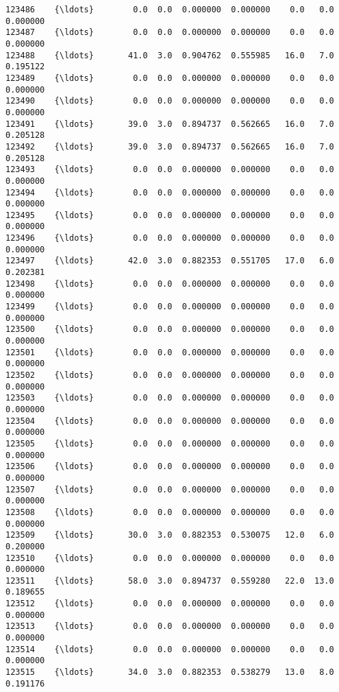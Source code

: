 \documentclass[11pt]{article}
\begin{document}
\begin{Verbatim}[commandchars=\\\{\}]
123486    {\ldots}        0.0  0.0  0.000000  0.000000    0.0   0.0  0.000000   
123487    {\ldots}        0.0  0.0  0.000000  0.000000    0.0   0.0  0.000000   
123488    {\ldots}       41.0  3.0  0.904762  0.555985   16.0   7.0  0.195122   
123489    {\ldots}        0.0  0.0  0.000000  0.000000    0.0   0.0  0.000000   
123490    {\ldots}        0.0  0.0  0.000000  0.000000    0.0   0.0  0.000000   
123491    {\ldots}       39.0  3.0  0.894737  0.562665   16.0   7.0  0.205128   
123492    {\ldots}       39.0  3.0  0.894737  0.562665   16.0   7.0  0.205128   
123493    {\ldots}        0.0  0.0  0.000000  0.000000    0.0   0.0  0.000000   
123494    {\ldots}        0.0  0.0  0.000000  0.000000    0.0   0.0  0.000000   
123495    {\ldots}        0.0  0.0  0.000000  0.000000    0.0   0.0  0.000000   
123496    {\ldots}        0.0  0.0  0.000000  0.000000    0.0   0.0  0.000000   
123497    {\ldots}       42.0  3.0  0.882353  0.551705   17.0   6.0  0.202381   
123498    {\ldots}        0.0  0.0  0.000000  0.000000    0.0   0.0  0.000000   
123499    {\ldots}        0.0  0.0  0.000000  0.000000    0.0   0.0  0.000000   
123500    {\ldots}        0.0  0.0  0.000000  0.000000    0.0   0.0  0.000000   
123501    {\ldots}        0.0  0.0  0.000000  0.000000    0.0   0.0  0.000000   
123502    {\ldots}        0.0  0.0  0.000000  0.000000    0.0   0.0  0.000000   
123503    {\ldots}        0.0  0.0  0.000000  0.000000    0.0   0.0  0.000000   
123504    {\ldots}        0.0  0.0  0.000000  0.000000    0.0   0.0  0.000000   
123505    {\ldots}        0.0  0.0  0.000000  0.000000    0.0   0.0  0.000000   
123506    {\ldots}        0.0  0.0  0.000000  0.000000    0.0   0.0  0.000000   
123507    {\ldots}        0.0  0.0  0.000000  0.000000    0.0   0.0  0.000000   
123508    {\ldots}        0.0  0.0  0.000000  0.000000    0.0   0.0  0.000000   
123509    {\ldots}       30.0  3.0  0.882353  0.530075   12.0   6.0  0.200000   
123510    {\ldots}        0.0  0.0  0.000000  0.000000    0.0   0.0  0.000000   
123511    {\ldots}       58.0  3.0  0.894737  0.559280   22.0  13.0  0.189655   
123512    {\ldots}        0.0  0.0  0.000000  0.000000    0.0   0.0  0.000000   
123513    {\ldots}        0.0  0.0  0.000000  0.000000    0.0   0.0  0.000000   
123514    {\ldots}        0.0  0.0  0.000000  0.000000    0.0   0.0  0.000000   
123515    {\ldots}       34.0  3.0  0.882353  0.538279   13.0   8.0  0.191176   


\end{Verbatim}
\end{document}
